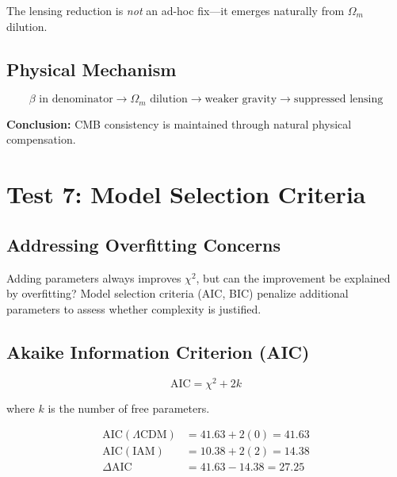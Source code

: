 \documentclass[11pt,letterpaper]{article}
\begin{document}
\noindent The lensing reduction is \textit{not} an ad-hoc fix—it emerges naturally from $\Omega_m$ dilution.

\subsection{Physical Mechanism}

\begin{equation}
\beta \text{ in denominator} \rightarrow \Omega_m \text{ dilution} \rightarrow \text{weaker gravity} \rightarrow \text{suppressed lensing}
\end{equation}

\noindent\textbf{Conclusion:} CMB consistency is maintained through natural physical compensation.

\section{Test 7: Model Selection Criteria}

\subsection{Addressing Overfitting Concerns}

Adding parameters always improves $\chi^2$, but can the improvement be explained by overfitting? Model selection criteria (AIC, BIC) penalize additional parameters to assess whether complexity is justified.

\subsection{Akaike Information Criterion (AIC)}

\begin{equation}
\text{AIC} = \chi^2 + 2k
\end{equation}

where $k$ is the number of free parameters.

\begin{align*}
\text{AIC}(\Lambda\text{CDM}) &= 41.63 + 2(0) = 41.63 \\
\text{AIC}(\text{IAM}) &= 10.38 + 2(2) = 14.38 \\
\Delta\text{AIC} &= 41.63 - 14.38 = 27.25
\end{align*}
\end{document}
